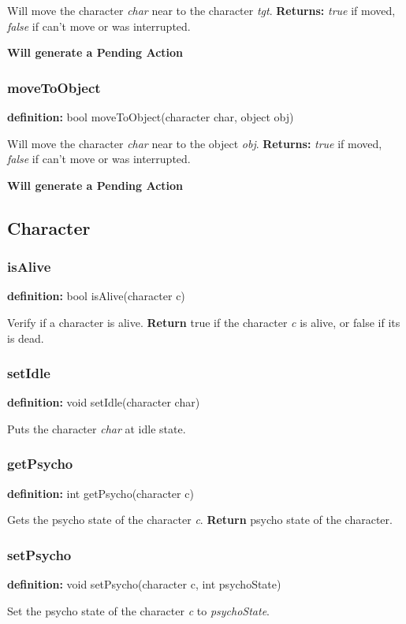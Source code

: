 \documentclass[ letterpaper,12pt]{article}
\begin{document}
Will move the character {\it char} near to the character {\it tgt}. {\bf Returns:} 
{\it true} if moved, {\it false} if can't move or was interrupted.

{\bf Will generate a Pending Action}

\subsubsection{moveToObject}
{\bf definition:} bool moveToObject(character char, object obj)

Will move the character {\it char} near to the object {\it obj}. {\bf Returns:} 
{\it true} if moved, {\it false} if can't move or was interrupted.

{\bf Will generate a Pending Action}

\subsection{Character}

\subsubsection{isAlive}
{\bf definition:} bool isAlive(character c)

Verify if a character is alive. {\bf Return} true if the character {\it c} is
alive, or false if its is dead.

\subsubsection{setIdle}
{\bf definition:} void setIdle(character char)

Puts the character {\it char} at idle state.

\subsubsection{getPsycho}
{\bf definition:} int getPsycho(character c)

Gets the psycho state of the character {\it c}. {\bf Return} psycho state of
the character.

\subsubsection{setPsycho}
{\bf definition:} void setPsycho(character c, int psychoState)

Set the psycho state of the character {\it c} to {\it psychoState}.
\end{document}
